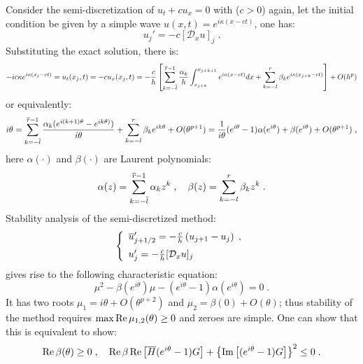 \smallskip
Consider the semi-discretization of $u_t+cu_x=0$ with ($c>0$) again, let the initial condition be given by a simple wave $u(x,t)=e^{i\kappa(x-ct)}$, one has:
\begin{displaymath}
  u_j' = -c[\mathcal{D}_xu]_j\;.
\end{displaymath}
Substituting the exact solution, there is:
\begin{displaymath}
  -ic\kappa e^{i\kappa(x_j-ct)} = u_t(x_j,t) = -cu_x(x_j,t) = -\frac{c}{h}\left[\sum_{k=-\overline{l}}^{\overline{r}-1}\frac{\alpha_k}{h}\int_{x_{j+k}}^{x_{j+k+1}}e^{i\kappa(x-ct)}dx+\sum_{k=-l}^r\beta_ke^{i\kappa(x_{j+k}-ct)}\right]+O(h^p)
\end{displaymath}
or equivalently:
\begin{equation}\label{eq:bg_hv_dx_adv_lte}
  i\theta = \sum_{k=-\overline{l}}^{\overline{r}-1}\frac{\alpha_k(e^{i(k+1)\theta}-e^{ik\theta)})}{i\theta}+\sum_{k=-l}^r\beta_ke^{ik\theta}+O(\theta^{p+1})
  = \frac{1}{i\theta}(e^{i\theta}-1)\alpha(e^{i\theta})+\beta(e^{i\theta})+O(\theta^{p+1})\;,
\end{equation}
here $\alpha(\cdot)$ and $\beta(\cdot)$ are Laurent polynomials:
\begin{equation}\label{eq:bg_hv_dx_adv_poly}
  \alpha(z)=\sum_{k=-\overline{l}}^{\overline{r}-1}\alpha_kz^k\;,\quad\beta(z)=\sum_{k=-l}^r\beta_kz^k\;.
\end{equation}
Stability analysis of the semi-discretized method:
\begin{equation}\label{eq:bg_hv_dx_adv_semi}
  \left\{\begin{array}{l}
    \overline{u}'_{\phf{j}} = -\frac{c}{h}\left(u_{j+1}-u_j\right)\;, \\ \vspace*{-.1in} \\
    u'_j = -\frac{c}{h}[\mathcal{D}_xu]_j
  \end{array}\right.
\end{equation}
gives rise to the following characteristic equation:
\begin{equation}\label{eq:bg_hv_dx_adv_semi_char}
  \mu^2-\beta(e^{i\theta})\mu-(e^{i\theta}-1)\alpha(e^{i\theta}) = 0\;.
\end{equation}
It has two roots $\mu_1=i\theta+O(\theta^{p+2})$ and $\mu_2=\beta(0)+O(\theta)$; thus stability of the method requires $\max\operatorname{Re}\mu_{1,2}(\theta)\ge0$ and zeroes are simple.
One can show that this is equivalent to show:
\begin{equation}\label{eq:bg_hv_dx_adv_semi_iff}
  \operatorname{Re}\beta(\theta)\ge0\;,\quad\operatorname{Re}\beta\operatorname{Re}\left[\overline{H}(e^{i\theta}-1)G\right]+\left\{\operatorname{Im}\left[(e^{i\theta}-1)G\right]\right\}^2\le0\;.
\end{equation}

